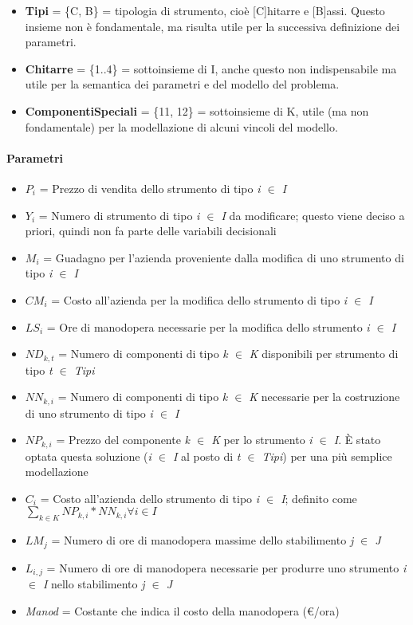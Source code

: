 \begin{itemize}
\begin{enumerate}
\end{enumerate}
\item[] \textbf{Tipi} = \{C, B\} = tipologia di strumento, cioè [C]hitarre e [B]assi. Questo insieme non è fondamentale, ma risulta utile per la successiva definizione dei parametri.
\item[] \textbf{Chitarre} = \{1..4\} = sottoinsieme di I, anche questo non indispensabile ma utile per la semantica dei parametri e del modello del problema.
\item[] \textbf{ComponentiSpeciali} = \{11, 12\} = sottoinsieme di K, utile (ma non fondamentale) per la modellazione di alcuni vincoli del modello.
\end{itemize}

\paragraph*{Parametri}
\begin{itemize}
\item[] $P_i$ = Prezzo di vendita dello strumento di tipo \textit{i $\in$ I}
\item[] $Y_i$ = Numero di strumento di tipo \textit{i $\in$ I} da modificare; questo viene deciso a priori, quindi non fa parte delle variabili decisionali
\item[] $M_i$ = Guadagno per l'azienda proveniente dalla modifica di uno strumento di tipo \textit{i $\in$ I}
\item[] $CM_i$ = Costo all'azienda per la modifica dello strumento di tipo \textit{i $\in$ I}
\item[] $LS_i$ = Ore di manodopera necessarie per la modifica dello strumento \textit{i $\in$ I}
\item[] $ND_{k,t}$ = Numero di componenti di tipo \textit{k $\in$ K} disponibili per strumento di tipo \textit{t $\in$ Tipi}
\item[] $NN_{k,i}$ = Numero di componenti di tipo \textit{k $\in$ K} necessarie per la costruzione di uno strumento di tipo \textit{i $\in$ I}
\item[] $NP_{k,i}$ = Prezzo del componente \textit{k $\in$ K} per lo strumento \textit{i $\in$ I}. È stato optata questa soluzione (\textit{i $\in$ I} al posto di \textit{t $\in$ Tipi}) per una più semplice modellazione
\item[] $C_i$ = Costo all'azienda dello strumento di tipo \textit{i $\in$ I}; definito come \\ $\sum_{k\in K} NP_{k,i}*NN_{k,i} \forall i\in I$
\item[] $LM_j$ = Numero di ore di manodopera massime dello stabilimento \textit{j $\in$ J}
\item[] $L_{i,j}$ = Numero di ore di manodopera necessarie per produrre uno strumento \textit{i $\in$ I} nello stabilimento \textit{j $\in$ J}
\item[] \textit{Manod} = Costante che indica il costo della manodopera (\euro /ora)
\end{itemize}

